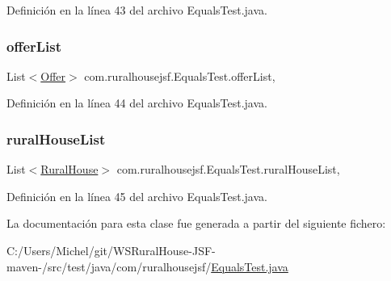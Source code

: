 Definición en la línea 43 del archivo Equals\+Test.\+java.

\mbox{\label{classcom_1_1ruralhousejsf_1_1_equals_test_abf5b3398125f0ed991c84afb429512f4}} 
\subsubsection{\texorpdfstring{offerList}{offerList}}
{\footnotesize\ttfamily List$<$\mbox{\hyperlink{classcom_1_1ruralhousejsf_1_1domain_1_1_offer}{Offer}}$>$ com.\+ruralhousejsf.\+Equals\+Test.\+offer\+List\hspace{0.3cm}{\ttfamily [static]}, {\ttfamily [package]}}



Definición en la línea 44 del archivo Equals\+Test.\+java.

\mbox{\label{classcom_1_1ruralhousejsf_1_1_equals_test_a9bdc3ab9b2c103383f6c34f253fe8307}} 
\subsubsection{\texorpdfstring{ruralHouseList}{ruralHouseList}}
{\footnotesize\ttfamily List$<$\mbox{\hyperlink{classcom_1_1ruralhousejsf_1_1domain_1_1_rural_house}{Rural\+House}}$>$ com.\+ruralhousejsf.\+Equals\+Test.\+rural\+House\+List\hspace{0.3cm}{\ttfamily [static]}, {\ttfamily [package]}}



Definición en la línea 45 del archivo Equals\+Test.\+java.



La documentación para esta clase fue generada a partir del siguiente fichero\+:\begin{DoxyCompactItemize}
\item 
C\+:/\+Users/\+Michel/git/\+W\+S\+Rural\+House-\/\+J\+S\+F-\/maven-\//src/test/java/com/ruralhousejsf/\mbox{\hyperlink{_equals_test_8java}{Equals\+Test.\+java}}\end{DoxyCompactItemize}
